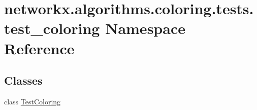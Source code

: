 \hypertarget{namespacenetworkx_1_1algorithms_1_1coloring_1_1tests_1_1test__coloring}{}\section{networkx.\+algorithms.\+coloring.\+tests.\+test\+\_\+coloring Namespace Reference}
\label{namespacenetworkx_1_1algorithms_1_1coloring_1_1tests_1_1test__coloring}
\subsection*{Classes}
\begin{DoxyCompactItemize}
\item 
class \hyperlink{classnetworkx_1_1algorithms_1_1coloring_1_1tests_1_1test__coloring_1_1TestColoring}{Test\+Coloring}
\end{DoxyCompactItemize}
